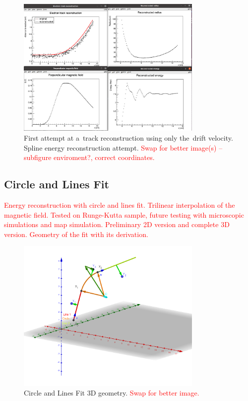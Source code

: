 \documentclass[]{article}
\begin{document}
			\begin{figure}
				\centering
				\includegraphics[width=0.8\textwidth]{9010_splines.png}
				\caption{First attempt at a~track reconstruction using only the~drift velocity. Spline energy reconstruction attempt. \textcolor{red}{Swap for better image(s) -- subfigure enviroment?, correct coordinates.}}
				\label{fig:9010splines}
			\end{figure}
		
		\subsection{Circle and Lines Fit}
			\textcolor{red}{Energy reconstruction with circle and lines fit. Trilinear interpolation of the magnetic field. Tested on Runge-Kutta sample, future testing with microscopic simulations and map simulation. Preliminary 2D version and complete 3D version. Geometry of the fit with its derivation.}
			
			\begin{figure}
				\centering
				\includegraphics[width=0.8\textwidth]{circlefit.png}
				\caption{Circle and Lines Fit 3D geometry. \textcolor{red}{Swap for better image.}}
				\label{fig:circlefit}
			\end{figure}
					
\end{document}
